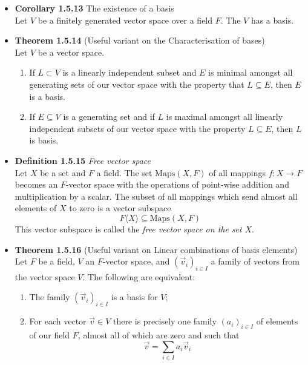 \documentclass[11pt,a4paper]{article}
\begin{document}
\begin{itemize}
    \item \textbf{Corollary 1.5.13} The existence of a basis \\
        Let $V$ be a finitely generated vector space over a field $F$.  The $V$ has a basis.

    \item \textbf{Theorem 1.5.14} (Useful variant on the Characterisation of bases) \\
        Let $V$ be a vector space.
        \begin{enumerate}
            \item If $L \subset V$ is a linearly independent subset and $E$ is minimal
                amongst all generating sets of our vector space with the property that
                $L \subseteq E$, then $E$ is a basis.
            \item If $E \subseteq V$ is a generating set and if $L$ is maximal amongst all
                linearly independent subsets of our vector space with the property
                $L \subseteq E$, then $L$ is  basis.
        \end{enumerate}

    \item \textbf{Definition 1.5.15} \emph{Free vector space} \\
        Let $X$ be a set and $F$ a field.
        The set $\text{Maps}(X,F)$ of all mappings $f : X \to F$ becomes an $F$-vector space
        with the operations of point-wise addition and multiplication by a scalar.
        The subset of all mappings which send almost all elements of
        $X$ to zero is a vector subspace
        \[
            F \langle X \rangle \subseteq \text{Maps}(X,F)
        \]
        This vector subspace is called the \emph{free vector space on the set} $X$.

    \item \textbf{Theorem 1.5.16} (Useful variant on Linear combinations of basis elements) \\
        Let $F$ be a field, $V$ an $F$-vector space, and ${(\vec{v}_i)}_{i\in I}$
        a family of vectors from the vector space $V$.
        The following are equivalent:
        \begin{enumerate}
            \item The family ${(\vec{v}_i)}_{i\in I}$ is a basis for $V$;
            \item For each vector $\vec{v} \in V$ there is precisely one family
                ${(a_i)}_{i \in I}$ of elements of our field $F$,
                almost all of which are zero and such that
                \[
                    \vec{v} = \sum_{i \in I} a_i \vec{v}_i
                \]
        \end{enumerate}

\end{itemize}
\end{document}
